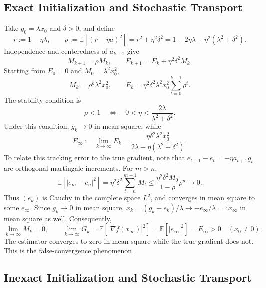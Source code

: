 \subsection{Exact Initialization and Stochastic Transport}
\label{subsec:exact-init-stochastic-transport}

Take $g_0=\lambda x_0$ and $\delta>0$, and define
\[
r:=1-\eta\lambda,\qquad
\rho:=\mathbb E[(r-\eta a)^2]
=r^2+\eta^2\delta^2
=1-2\eta\lambda+\eta^2(\lambda^2+\delta^2).
\]
Independence and centeredness of $a_{k+1}$ give
\begin{equation}
\label{eq:quadratic-moment-recursions}
M_{k+1}=\rho M_k,\qquad E_{k+1}=E_k+\eta^2\delta^2M_k.
\end{equation}
Starting from $E_0=0$ and $M_0=\lambda^2x_0^2$,
\begin{equation}
\label{eq:quadratic-exact-init-moments}
M_k=\rho^k\lambda^2x_0^2,\qquad
E_k=\eta^2\delta^2\lambda^2x_0^2\sum_{t=0}^{k-1}\rho^t.
\end{equation}
The stability condition is
\begin{equation}
\label{eq:quadratic-stability}
\rho<1\quad\Longleftrightarrow\quad
0<\eta<\frac{2\lambda}{\lambda^2+\delta^2}.
\end{equation}
Under this condition, $g_k\to0$ in mean square, while
\begin{equation}
\label{eq:quadratic-exact-init-residual}
E_\infty:=\lim_{k\to\infty}E_k
=\frac{\eta\delta^2\lambda^2x_0^2}
       {2\lambda-\eta(\lambda^2+\delta^2)}.
\end{equation}
To relate this tracking error to the true gradient, note that
$e_{t+1}-e_t=-\eta a_{t+1}g_t$ are orthogonal martingale increments.
For $m>n$,
\[
\mathbb E[|e_m-e_n|^2]
=\eta^2\delta^2\sum_{t=n}^{m-1}M_t
\leq\frac{\eta^2\delta^2M_0}{1-\rho}\rho^n\longrightarrow0.
\]
Thus $(e_k)$ is Cauchy in the complete space $L^2$, and converges
in mean square to some $e_\infty$. Since $g_k\to0$ in mean square,
$x_k=(g_k-e_k)/\lambda\to-e_\infty/\lambda=:x_\infty$ in mean
square as well. Consequently,
\[
\lim_{k\to\infty}M_k=0,\qquad
\lim_{k\to\infty}G_k
=\mathbb E[|\nabla f(x_\infty)|^2]
=\mathbb E[|e_\infty|^2]=E_\infty>0\quad(x_0\ne0).
\]
The estimator converges to zero in mean square while the true
gradient does not. This is the false-convergence phenomenon.

\subsection{Inexact Initialization and Stochastic Transport}
\label{subsec:inexact-init-stochastic-transport}

